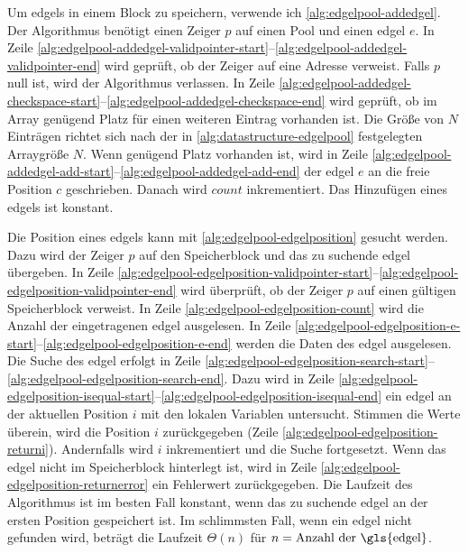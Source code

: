 



Um \glspl{edgel} in einem Block zu speichern, verwende ich \autoref{alg:edgelpool-addedgel}. Der Algorithmus benötigt
 einen Zeiger $p$ auf einen Pool und einen \gls{edgel} $e$. In Zeile
 \ref{alg:edgelpool-addedgel-validpointer-start}--\ref{alg:edgelpool-addedgel-validpointer-end} wird geprüft, ob der
 Zeiger auf eine Adresse verweist. Falls $p$ null ist, wird der Algorithmus verlassen. In Zeile
 \ref{alg:edgelpool-addedgel-checkspace-start}--\ref{alg:edgelpool-addedgel-checkspace-end} wird geprüft, ob im Array
 genügend Platz für einen weiteren Eintrag vorhanden ist. Die Größe von $N$ Einträgen richtet sich nach der in
 \autoref{alg:datastructure-edgelpool} festgelegten Arraygröße $N$. Wenn genügend Platz vorhanden ist, wird in Zeile
 \ref{alg:edgelpool-addedgel-add-start}--\ref{alg:edgelpool-addedgel-add-end} der \gls{edgel} $e$ an die freie
 Position $c$ geschrieben. Danach wird $\mathit{count}$ inkrementiert. Das Hinzufügen eines \glspl{edgel} ist konstant.



Die Position eines \glspl{edgel} kann mit \autoref{alg:edgelpool-edgelposition} gesucht werden. Dazu wird der Zeiger
 $p$ auf den Speicherblock und das zu suchende \gls{edgel} übergeben. In Zeile
 \ref{alg:edgelpool-edgelposition-validpointer-start}--\ref{alg:edgelpool-edgelposition-validpointer-end} wird
 überprüft, ob der Zeiger $p$ auf einen gültigen Speicherblock verweist. In Zeile
 \ref{alg:edgelpool-edgelposition-count} wird die Anzahl der eingetragenen \gls{edgel} ausgelesen. In Zeile
 \ref{alg:edgelpool-edgelposition-e-start}--\ref{alg:edgelpool-edgelposition-e-end} werden die Daten des \gls{edgel}
 ausgelesen. Die Suche des \gls{edgel} erfolgt in Zeile
 \ref{alg:edgelpool-edgelposition-search-start}--\ref{alg:edgelpool-edgelposition-search-end}. Dazu wird in Zeile
 \ref{alg:edgelpool-edgelposition-isequal-start}--\ref{alg:edgelpool-edgelposition-isequal-end} ein \gls{edgel} an der
 aktuellen Position $i$ mit den lokalen Variablen untersucht. Stimmen die Werte überein, wird die Position $i$
 zurückgegeben (Zeile \ref{alg:edgelpool-edgelposition-returni}). Andernfalls wird $i$ inkrementiert und die Suche
 fortgesetzt. Wenn das \gls{edgel} nicht im Speicherblock hinterlegt ist, wird in Zeile
 \ref{alg:edgelpool-edgelposition-returnerror} ein Fehlerwert zurückgegeben. Die Laufzeit des Algorithmus ist im besten
 Fall konstant, wenn das zu suchende \gls{edgel} an der ersten Position gespeichert ist. Im schlimmsten Fall, wenn ein
 \gls{edgel} nicht gefunden wird, beträgt die Laufzeit $\Theta{(n)}$ für $n = \text{Anzahl der \gls{edgel}}$.

